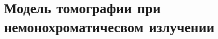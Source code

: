 \begin{comment}
Тогда интенсивность излуче-
ния вдоль некоторого бесконечно тонкого луча со сдвигом s, %
 после про-
хождения через объект будет
Для краткости записи далее аргументы угла и сдвига, задающие прямую %

будут опускаться. Данные значения подвергаются нормировке и логарифмиро-
ванию, в результате восстанавливается распределение линейного коэффициента
ослабления для энергии зондирующего излучения, путем решения системы
уравнений:
для всех углов измерения %
 и сдвигов s. Оператор интегрирования вдоль всех
возможных направлений называется преобразованием Радона. При восстановлении реальных измерений как входные данные%
так и искомая характе-
ристика f(x, y) представляются дискретными изображениями размеров 
соответственно, а преобразование Радона заменяется на преобра-
зование Хафа.
Для восстановления распределения линейного коэффициента ослабления ис-
пользуются в основном интегральные или алгебраические методы [4]. Особый
интерес представляют последние, так как их, как будет показано ниже, можно
использовать и для восстановления экспериментов, проводимых с использова-
нием полихроматического пучка. Пусть 
– соответ-
ственно входные и выходные данные, H – матрица линейного преобразования
Хафа размера 
 . Тогда томографическую проекцию можно записать
в виде СЛАУ
Решение этой СЛАУ методом наименьших квадратов в явном виде невозможно
ввиду огромного размера матрицы H, однако ее умножение на вектор f, как и
умножение транспонированной матрицы H T может быть посчитано быстро за
O(N 2 log N) используя методы обработки изображений [5]. Применяя метод
градиентного спуска для минимизации L2 нормы расхождения, получаем шаг
градиентного спуска
\end{comment}

\section{Модель томографии при немонохроматичесвом излучении}

